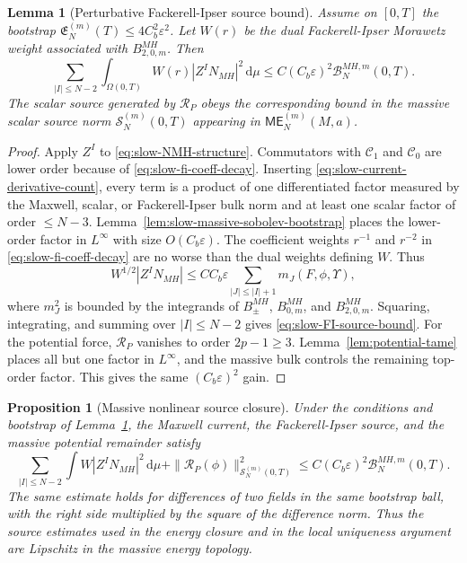 \documentclass[11pt]{article}
\numberwithin{equation}{section}
\theoremstyle{plain}
\newtheorem{proposition}[theorem]{Proposition}
\newtheorem{lemma}[theorem]{Lemma}
\theoremstyle{definition}
\theoremstyle{remark}
\newcommand{\dd}{\mathrm{d}}
\newcommand{\ME}{\mathsf{ME}}
\begin{document}
\begin{lemma}[Perturbative Fackerell-Ipser source bound]\label{lem:slow-FI-source-bound}
Assume on \([0,T]\) the bootstrap \(\mathfrak E_N^{(m)}(T)\le4C_b^2\varepsilon^2\).  Let \(W(r)\) be the dual Fackerell-Ipser Morawetz weight associated with \(B^{MH}_{2,0,m}\).  Then
\begin{equation}\label{eq:slow-FI-source-bound}
 \sum_{|I|\le N-2}\int_{\Omega(0,T)} W(r)|Z^IN_{MH}|^2\,\dd\mu
 \le C(C_b\varepsilon)^2\mathcal B_N^{MH,m}(0,T).
\end{equation}
The scalar source generated by \(\mathcal R_P\) obeys the corresponding bound in the massive scalar source norm \(\mathcal S_N^{(m)}(0,T)\) appearing in \(\ME_N^{(m)}(M,a)\).
\end{lemma}

\begin{proof}
Apply \(Z^I\) to \eqref{eq:slow-NMH-structure}.  Commutators with \(\mathcal C_1\) and \(\mathcal C_0\) are lower order because of \eqref{eq:slow-fi-coeff-decay}.  Inserting \eqref{eq:slow-current-derivative-count}, every term is a product of one differentiated factor measured by the Maxwell, scalar, or Fackerell-Ipser bulk norm and at least one scalar factor of order \(\le N-3\).  Lemma~\ref{lem:slow-massive-sobolev-bootstrap} places the lower-order factor in \(L^\infty\) with size \(O(C_b\varepsilon)\).  The coefficient weights \(r^{-1}\) and \(r^{-2}\) in \eqref{eq:slow-fi-coeff-decay} are no worse than the dual weights defining \(W\).  Thus
\begin{equation}
 W^{1/2}|Z^IN_{MH}|
 \le C C_b\varepsilon
 \sum_{|J|\le |I|+1}m_J(F,\phi,\Upsilon),
\end{equation}
where \(m_J^2\) is bounded by the integrands of \(B^{MH}_{\pm}\), \(B^{MH}_{0,m}\), and \(B^{MH}_{2,0,m}\).  Squaring, integrating, and summing over \(|I|\le N-2\) gives \eqref{eq:slow-FI-source-bound}.  For the potential force, \(\mathcal R_P\) vanishes to order \(2p-1\ge3\).  Lemma~\ref{lem:potential-tame} places all but one factor in \(L^\infty\), and the massive bulk controls the remaining top-order factor.  This gives the same \((C_b\varepsilon)^2\) gain.
\end{proof}

\begin{proposition}[Massive nonlinear source closure]\label{prop:slow-massive-source-closure}
Under the conditions and bootstrap of Lemma~\ref{lem:slow-FI-source-bound}, the Maxwell current, the Fackerell-Ipser source, and the massive potential remainder satisfy
\begin{equation}\label{eq:slow-source-closure-prop}
 \sum_{|I|\le N-2}\int W|Z^IN_{MH}|^2\,\dd\mu
 +\|\mathcal R_P(\phi)\|_{\mathcal S_N^{(m)}(0,T)}^2
 \le C(C_b\varepsilon)^2\mathcal B_N^{MH,m}(0,T).
\end{equation}
The same estimate holds for differences of two fields in the same bootstrap ball, with the right side multiplied by the square of the difference norm.  Thus the source estimates used in the energy closure and in the local uniqueness argument are Lipschitz in the massive energy topology.
\end{proposition}
\end{document}
